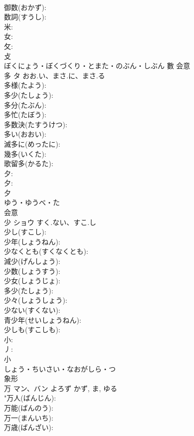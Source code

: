 \documentclass[8pt]{extreport}
\begin{document}
\begin{CJK}{UTF8}{min}
\\	御数(おかず): 
\\	数詞(すうし): 
\\	米: 
\\	女: 
\\	攵: 
\\	攴	
\\	ぼくにょう・ぼくづくり・とまた・のぶん・しぶん	數	会意 
\\	多	タ	おお.い、まさ.に、まさ.る		
\\	多様(たよう): 
\\	多少(たしょう): 
\\	多分(たぶん): 
\\	多忙(たぼう): 
\\	多数決(たすうけつ): 
\\	多い(おおい): 
\\	滅多に(めったに): 
\\	幾多(いくた): 
\\	歌留多(かるた): 
\\	夕: 
\\	夕: 
\\	夕	
\\	ゆう・ゆうべ・た	
\\	会意 
\\	少	ショウ	すく.ない、すこ.し		
\\	少し(すこし): 
\\	少年(しょうねん): 
\\	少なくとも(すくなくとも): 
\\	減少(げんしょう): 
\\	少数(しょうすう): 
\\	少女(しょうじょ): 
\\	多少(たしょう): 
\\	少々(しょうしょう): 
\\	少ない(すくない): 
\\	青少年(せいしょうねん): 
\\	少しも(すこしも): 
\\	小: 
\\	丿: 
\\	小	
\\	しょう・ちいさい・なおがしら・つ	
\\	象形 
\\	万	マン、バン	よろず	かず, ま, ゆる	
\\	"万人(ばんじん): 
\\	万能(ばんのう): 
\\	万一(まんいち): 
\\	万歳(ばんざい): 

\end{CJK}
\end{document}
